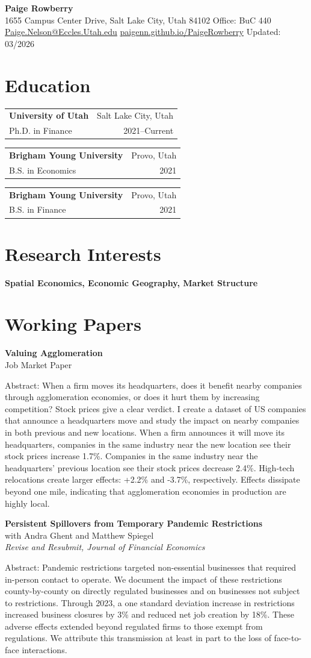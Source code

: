 \documentclass[11pt]{article}
\makeatletter
\newcommand{\eduentry}[4]{%
\begin{tabular*}{\textwidth}{@{}l@{\extracolsep{\fill}}r@{}}
\textbf{#1} & #2 \\
#3 & #4 \\
\end{tabular*}\vspace{0.6em}
}
\newcommand{\cvsection}[2][12]{%
\Needspace{#1\baselineskip}%
\section*{#2}%
}
\newenvironment{paperentry}{%
\samepage
}{%
\vspace{0.6em}%
\par
}
\makeatother
\begin{document}
\pagestyle{plain}

\begin{center}
{\LARGE \textbf{Paige Rowberry}}\\[0.3em]
1655 Campus Center Drive, Salt Lake City, Utah 84102 \textbar{} Office: BuC 440\\
\href{mailto:Paige.Nelson@Eccles.Utah.edu}{Paige.Nelson@Eccles.Utah.edu} \textbar{}
\href{https://paigenn.github.io/PaigeRowberry/}{paigenn.github.io/PaigeRowberry} \textbar{} Updated: 03/2026
\end{center}

\cvsection{Education}
\eduentry{University of Utah}{Salt Lake City, Utah}{Ph.D. in Finance}{2021--Current}
\eduentry{Brigham Young University}{Provo, Utah}{B.S. in Economics}{2021}
\eduentry{Brigham Young University}{Provo, Utah}{B.S. in Finance}{2021}

\cvsection{Research Interests}
\textbf{Spatial Economics, Economic Geography, Market Structure}

\cvsection{Working Papers}
\begin{paperentry}
\textbf{Valuing Agglomeration}\\
Job Market Paper

Abstract: When a firm moves its headquarters, does it benefit nearby companies through agglomeration economies, or does it hurt them by increasing competition? Stock prices give a clear verdict. I create a dataset of US companies that announce a headquarters move and study the impact on nearby companies in both previous and new locations. When a firm announces it will move its headquarters, companies in the same industry near the new location see their stock prices increase 1.7\%. Companies in the same industry near the headquarters' previous location see their stock prices decrease 2.4\%. High-tech relocations create larger effects: +2.2\% and -3.7\%, respectively. Effects dissipate beyond one mile, indicating that agglomeration economies in production are highly local.
\end{paperentry}

\begin{paperentry}
\textbf{Persistent Spillovers from Temporary Pandemic Restrictions}\\
with Andra Ghent and Matthew Spiegel\\
\emph{Revise and Resubmit, Journal of Financial Economics}

Abstract: Pandemic restrictions targeted non-essential businesses that required in-person contact to operate. We document the impact of these restrictions county-by-county on directly regulated businesses and on businesses not subject to restrictions. Through 2023, a one standard deviation increase in restrictions increased business closures by 3\% and reduced net job creation by 18\%. These adverse effects extended beyond regulated firms to those exempt from regulations. We attribute this transmission at least in part to the loss of face-to-face interactions.
\end{paperentry}
\end{document}
